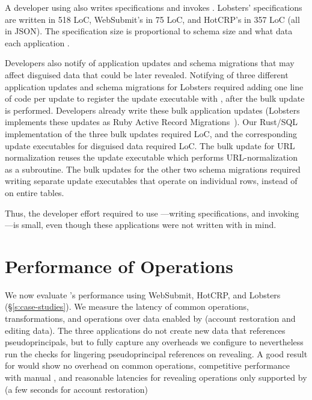 %
A developer using \sys also writes \xx specifications and invokes \sys.
Lobsters' \xx specifications are written in 518 LoC, WebSubmit's in 75 LoC, and
HotCRP's in 357 LoC (all in JSON).  The specification size is proportional to
schema size and what data each application \xxs.

Developers also notify \sys of application updates and schema migrations that
may affect disguised data that could be later revealed.  Notifying \sys of three
different application updates and schema migrations for Lobsters required adding
one line of code per update to register the update executable with \sys, after
the bulk update is performed. 
%
Developers already write these bulk application updates (\eg Lobsters
implements these updates as Ruby Active Record Migrations~\cite{ruby_arm}). 
%
Our Rust/SQL implementation of the three bulk updates required  LoC,
and the corresponding update executables for disguised data required 
LoC. The bulk update for URL normalization reuses the update executable which
performs URL-normalization as a subroutine. The bulk updates for the other two
schema migrations required writing separate update executables that operate on
individual rows, instead of on entire tables.

%
Thus, the developer effort required to use \sys---writing \sys specifications, and
invoking \sys---is small, even though these applications were not written with
\sys in mind.

\section{Performance of \sys Operations}
\label{s:eval-ops}

%
We now evaluate \sys's performance using WebSubmit,
HotCRP, and Lobsters (\S\ref{s:case-studies}).
%
%
We measure the latency of common operations, \xxing transformations,
and operations over \xxed data enabled by \sys
(\eg account restoration and editing \xxed data).
%
The three applications do not create new data that references pseudoprincipals,
but to fully capture any overheads we configure \sys to nevertheless run the
checks for lingering pseudoprincipal references on revealing.
%
A good result for \sys would show no overhead on common operations,
competitive performance with manual \xxing, and reasonable
latencies for revealing operations only supported by \sys
(\eg a few seconds for account restoration)
%

